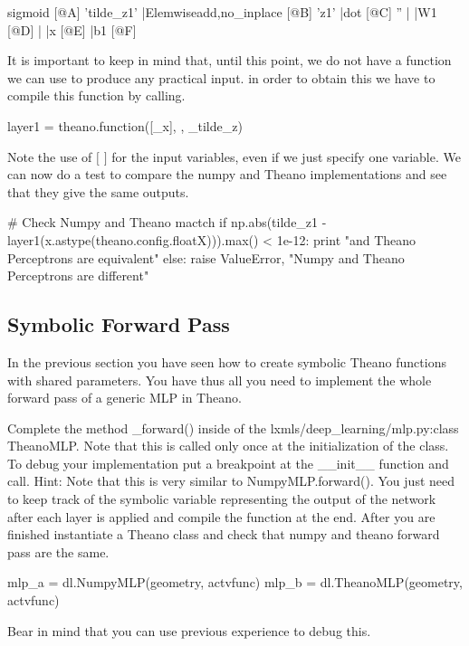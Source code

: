 \begin{exercise}
\begin{python}
sigmoid [@A] 'tilde_z1'
 |Elemwise{add,no_inplace} [@B] 'z1'
   |dot [@C] ''
   | |W1 [@D]
   | |x [@E]
   |b1 [@F]

\end{python}
It is important to keep in mind that, until this point, we do not have a function we can use to produce any practical input. in order to obtain this we have to compile this function by calling.    
\begin{python}
layer1 = theano.function([_x], , _tilde_z)
\end{python}
Note the use of $[$ $]$ for the input variables, even if we just specify one variable. We can now do a test to compare the numpy and Theano implementations and see that they give the same outputs.
\begin{python}
# Check Numpy and Theano mactch
if np.abs(tilde_z1 - layer1(x.astype(theano.config.floatX))).max() < 1e-12:
    print "\nNumpy and Theano Perceptrons are equivalent"
else:
    raise ValueError, "Numpy and Theano Perceptrons are different"
\end{python}
\end{exercise}

\subsection{Symbolic Forward Pass}

In the previous section you have seen how to create symbolic Theano functions with shared parameters. You have thus all you need to implement the whole forward pass of a generic MLP in Theano.
\begin{exercise}
Complete the method \_forward() inside of the lxmls/deep\_learning/mlp.py:class TheanoMLP. Note that this is called only once at the initialization of the class. To debug your implementation put a breakpoint at the \_\_init\_\_ function and call. Hint: Note that this is very similar to NumpyMLP.forward(). You just need to keep track of the symbolic variable representing the output of the network after each layer is applied and compile the function at the end. After you are finished instantiate a Theano class and check that numpy and theano forward pass are the same. 

\begin{python}
mlp_a = dl.NumpyMLP(geometry, actvfunc)
mlp_b = dl.TheanoMLP(geometry, actvfunc)
\end{python}

Bear in mind that you can use previous experience to debug this.

\end{exercise}

